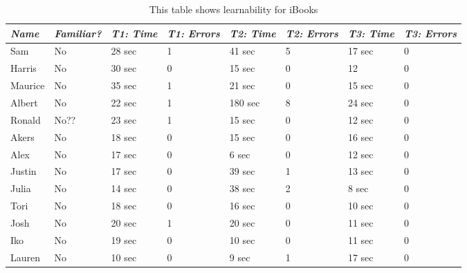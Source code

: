 \documentclass[12pt,letterpaper]{article}
\begin{document}
    \begin{table}
        \centering
        \begin{tabular}{|l|l|l|l|l|l|l|l|}
            \hline
            \emph{Name} & \emph{Familiar?} & \emph{T1: Time} & \emph{T1: Errors} & \emph{T2: Time} & \emph{T2: Errors} & \emph{T3: Time} & \emph{T3: Errors} \\
            \hline
            Sam & No & 28 sec & 1 & 41 sec & 5 & 17 sec & 0 \\
            \hline
            Harris & No & 30 sec & 0 & 15 sec & 0 & 12 & 0 \\
            \hline
            Maurice & No & 35 sec & 1 & 21 sec & 0 & 15 sec & 0 \\
            \hline
            Albert & No & 22 sec & 1 & 180 sec & 8 & 24 sec & 0 \\
            \hline
            Ronald & No?? & 23 sec & 1 & 15 sec & 0 & 12 sec & 0 \\
            \hline
            Akers & No & 18 sec & 0 & 15 sec & 0 & 16 sec & 0 \\
            \hline
            Alex & No & 17 sec & 0 & 6 sec & 0 & 12 sec & 0 \\
            \hline
            Justin & No & 17 sec & 0 & 39 sec & 1 & 13 sec & 0 \\
            \hline
            Julia & No & 14 sec & 0 & 38 sec & 2 & 8 sec & 0 \\
            \hline
            Tori & No & 18 sec & 0 & 16 sec & 0 & 10 sec & 0 \\
            \hline
            Josh & No & 20 sec & 1 & 20 sec & 0 & 11 sec & 0 \\
            \hline
            Iko & No & 19 sec & 0 & 10 sec & 0 & 11 sec & 0 \\
            \hline
            Lauren & No & 10 sec & 0 & 9 sec & 1 & 17 sec & 0 \\
        \end{tabular}
        \caption{This table shows learnability for iBooks}
    \end{table}
\end{document}
